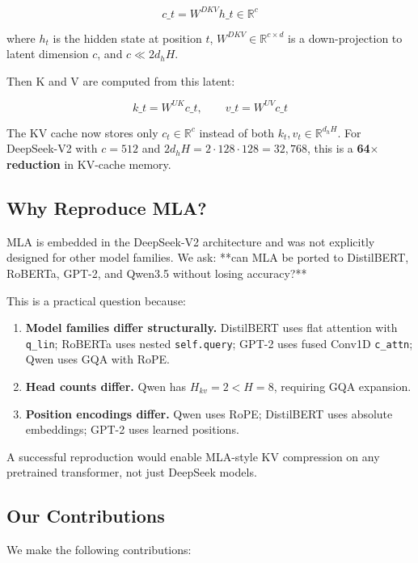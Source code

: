 \[
c\_t = W^{DKV} h\_t \in \mathbb{R}^{c}
\tag{1.2}
\]

where $h_t$ is the hidden state at position $t$, $W^{DKV} \in \mathbb{R}^{c \times d}$ 
is a down-projection to latent dimension $c$, and $c \ll 2 d_h H$.

Then K and V are computed from this latent:

\[
k\_t = W^{UK} c\_t, \qquad v\_t = W^{UV} c\_t
\tag{1.3}
\]

The KV cache now stores only $c_t \in \mathbb{R}^c$ instead of both 
$k_t, v_t \in \mathbb{R}^{d_h H}$. For DeepSeek-V2 with $c = 512$ and 
$2 d_h H = 2 \cdot 128 \cdot 128 = 32{,}768$, this is a \textbf{64$\times$ reduction} in 
KV-cache memory.

\subsection{Why Reproduce MLA?}

MLA is embedded in the DeepSeek-V2 architecture and was not explicitly 
designed for other model families. We ask: **can MLA be ported to 
DistilBERT, RoBERTa, GPT-2, and Qwen3.5 without losing accuracy?**

This is a practical question because:

\begin{enumerate}
\item \textbf{Model families differ structurally.} DistilBERT uses flat attention
  with \texttt{q\_lin}; RoBERTa uses nested \texttt{self.query}; GPT-2 uses fused Conv1D
  \texttt{c\_attn}; Qwen uses GQA with RoPE.
\item \textbf{Head counts differ.} Qwen has $H_{kv} = 2 < H = 8$, requiring GQA
  expansion.
\item \textbf{Position encodings differ.} Qwen uses RoPE; DistilBERT uses absolute
  embeddings; GPT-2 uses learned positions.

\end{enumerate}
A successful reproduction would enable MLA-style KV compression on any 
pretrained transformer, not just DeepSeek models.

\subsection{Our Contributions}

We make the following contributions:

